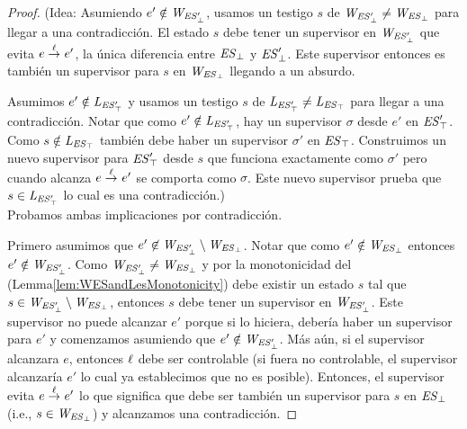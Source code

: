 \begin{proof}
	(Idea: Asumiendo $e' \notin \mathit{W_{\mathit{\mathit{ES}'_{\bot}}}}$, usamos un testigo $s$ de $\mathit{W_{\mathit{\mathit{ES}'_{\bot}}}} \neq 
	\mathit{W_{\mathit{\mathit{ES}_{\bot}}}}$ para llegar a una contradicción. El estado $s$ debe tener un supervisor en 
	$\mathit{W_{\mathit{\mathit{ES}'_{\bot}}}}$ que evita $e \overset{\ell}{\rightarrow}_{} e'$, la única diferencia entre $\mathit{\mathit{ES}_{\bot}}$ y $\mathit{\mathit{ES}'_{\bot}}$. Este supervisor entonces es también un supervisor para $s$ en $\mathit{W_{\mathit{\mathit{ES}_{\bot}}}}$ llegando a un absurdo. 
	
	Asumimos $e' \notin \mathit{L_{\mathit{\mathit{ES}'_{\top}}}}$ y usamos un testigo $s$ de $\mathit{L_{\mathit{\mathit{ES}'_{\top}}}} \neq \mathit{L_{\mathit{\mathit{ES}_{\top}}}}$ para llegar a una contradicción. Notar que como $e' \notin \mathit{L_{\mathit{\mathit{ES}'_{\top}}}}$, hay un supervisor $\sigma$ desde $e'$ en  
	$\mathit{\mathit{ES}'_{\top}}$. Como $s \notin \mathit{L_{\mathit{\mathit{ES}_{\top}}}}$ también debe haber un supervisor $\sigma'$ en $\mathit{\mathit{ES}_{\top}}$. Construimos un nuevo supervisor para $\mathit{\mathit{ES}'_{\top}}$ desde $s$ que funciona exactamente como $\sigma'$ pero cuando alcanza $e \overset{\ell}{\rightarrow}_{} e'$ se comporta como $\sigma$. Este nuevo supervisor prueba que $s \in \mathit{L_{\mathit{\mathit{ES}'_{\top}}}}$ lo cual es una contradicción.)\\


Probamos ambas implicaciones por contradicción. 

Primero asumimos que $e' \not \in 
\mathit{W_{\mathit{\mathit{ES}'_{\bot}}}} \setminus \mathit{W_{\mathit{\mathit{ES}_{\bot}}}}$. Notar que como $e' \notin \mathit{W_{\mathit{\mathit{ES}_{\bot}}}}$ entonces $e' \notin \mathit{W_{\mathit{\mathit{ES}'_{\bot}}}}$. Como $\mathit{W_{\mathit{\mathit{ES}'_{\bot}}}} \neq \mathit{W_{\mathit{\mathit{ES}_{\bot}}}}$ y por la monotonicidad del (Lemma\ref{lem:WESandLesMonotonicity}) debe existir un estado $s$ tal que $s \in \mathit{W_{\mathit{\mathit{ES}'_{\bot}}}} \setminus 
\mathit{W_{\mathit{\mathit{ES}_{\bot}}}}$, entonces $s$ debe tener un supervisor en $\mathit{W_{\mathit{\mathit{ES}'_{\bot}}}} $. Este supervisor no puede alcanzar $e'$ porque si lo hiciera, debería haber un supervisor para $e'$ y comenzamos asumiendo que $e' 
\notin \mathit{W_{\mathit{\mathit{ES}'_{\bot}}}}$. Más aún, si el supervisor alcanzara $e$, entonces $\ell$ debe ser controlable (si fuera no controlable, el supervisor alcanzaría $e'$ lo cual ya establecimos que no es posible). Entonces, el supervisor evita $e \overset{\ell}{\rightarrow}_{} e'$ lo que significa que debe ser también un supervisor para $s$ en $\mathit{\mathit{ES}_{\bot}}$ (i.e.,  $s \in \mathit{W_{\mathit{\mathit{ES}_{\bot}}}}$) y alcanzamos una contradicción.


\end{proof}

